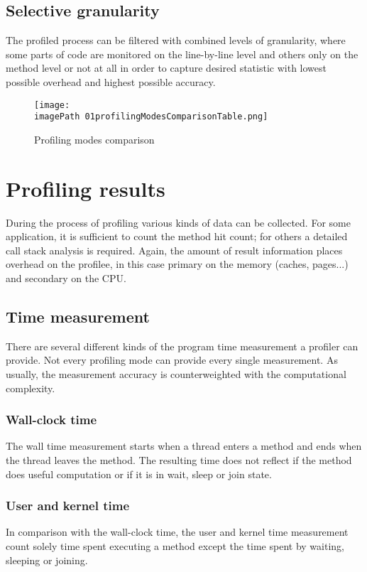 \subsection{Selective granularity}
The profiled process can be filtered with combined levels of granularity, where some parts of code are monitored on the line-by-line level and others only on the method level or not at all in order to capture desired statistic with lowest possible overhead and highest possible accuracy.

\begin{figure}
	\centering
		\texttt{[image: \\imagePath 01profilingModesComparisonTable.png]}
		\caption{Profiling modes comparison}
	\label{fig:01profilingModesComparisonTable}
\end{figure}


\section{Profiling results}
During the process of profiling various kinds of data can be collected. For some application, it is sufficient to count the method hit count; for others a detailed call stack analysis is required. Again, the amount of result information places overhead on the profilee, in this case primary on the memory (caches, pages...) and secondary on the CPU.

\subsection{Time measurement}
There are several different kinds of the program time measurement a profiler can provide. Not every profiling mode can provide every single measurement. As usually, the measurement accuracy is counterweighted with the computational complexity.

\subsubsection*{Wall-clock time}
The wall time measurement starts when a thread enters a method and ends when the thread leaves the method. The resulting time does not reflect if the method does useful computation or if it is in wait,  sleep or join state.

\subsubsection*{User and kernel time}
In comparison with the wall-clock time, the user and kernel time measurement count solely time spent executing a method except the time spent by waiting, sleeping or joining.

